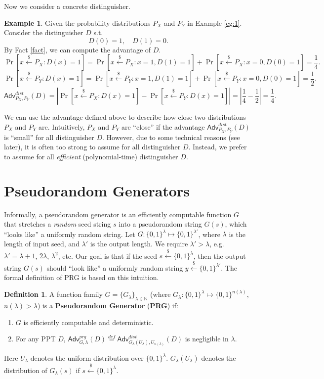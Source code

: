 \documentclass[12pt]{article}
\newcommand{\eqdef}{\stackrel{def}{=}}
\newcommand{\N}{\mathbb{N}}
\newcommand{\bits}{\{0,1\}}
\newcommand{\getsr}{\stackrel{\$}{\gets}}
\newcommand{\Adv}{\textsf{Adv}}
\theoremstyle{definition}
\newtheorem{definition}[theorem]{Definition}
\newtheorem{example}[theorem]{Example}
\begin{document}
Now we consider a concrete distinguisher.
\begin{example}
Given the probability distributions $P_X$ and $P_Y$ in Example \ref{eg:1}. Consider the distinguisher $D$ s.t.
$$D(0)=1, \quad D(1)=0.$$
By Fact \ref{fact}, we can compute the advantage of $D$.
$$\Pr[x\getsr P_X: D(x)=1] = \Pr[x\getsr P_X: x=1, D(1)=1] + \Pr[x\getsr P_X: x=0, D(0)=1] =\frac{1}{4}.$$
$$\Pr[x\getsr P_Y: D(x)=1] = \Pr[x\getsr P_Y: x=1, D(1)=1] + \Pr[x\getsr P_Y: x=0, D(0)=1] =\frac{1}{2}.$$
$$\Adv_{P_X,P_Y}^{dist}(D) = \left| \Pr[x\getsr P_X: D(x)=1] - \Pr[x\getsr P_Y: D(x)=1]\right| = \left|\frac{1}{4}-\frac{1}{2}\right| = \frac{1}{4}.$$
\end{example}

We can use the advantage defined above to describe how close two distributions $P_X$ and $P_Y$ are. Intuitively, $P_X$ and $P_Y$ are ``close'' if the advantage $\Adv_{P_X,P_Y}^{dist}(D)$ is ``small'' for all distinguisher $D$. However, due to some technical reasons (see later), it is often too strong to assume for all distinguisher $D$. Instead, we prefer to assume for all \emph{efficient} (polynomial-time) distinguisher $D$.

\section{Pseudorandom Generators}
Informally, a pseudorandom generator is an efficiently computable function $G$ that stretches a \emph{random} seed string $s$ into a pseudorandom string $G(s)$, which ``looks like'' a uniformly random string. 
Let $G: \bits^\lambda \mapsto \bits^{\lambda'}$, where $\lambda$ is the length of input seed, and $\lambda'$ is the output length. We require $\lambda' > \lambda$, e.g. $\lambda' = \lambda+1$, $2\lambda$, $\lambda^2$, etc. Our goal is that if the seed $s\getsr \bits^\lambda$, then the output string $G(s)$ should ``look like'' a uniformly random string $y\getsr\bits^{\lambda'}$. The formal definition of PRG is based on this intuition.
\begin{definition}
A function family $G = \{G_\lambda\}_{\lambda\in\N}$ (where $G_\lambda : \bits^\lambda \mapsto \bits^{n(\lambda)}$, $n(\lambda)>\lambda$) is a {\bf Pseudorandom Generator} ({\bf PRG}) if:
\begin{enumerate}
\item $G$ is efficiently computable and deterministic.
\item For any PPT $D$, $\Adv_{G,\lambda}^{prg}(D) \eqdef \Adv_{G_\lambda(U_\lambda),U_{n(\lambda)}}^{dist}(D)$ is negligible in $\lambda$.
\end{enumerate}
Here $U_\lambda$ denotes the uniform distribution over $\bits^\lambda$. $G_\lambda(U_\lambda)$ denotes the distribution of $G_\lambda(s)$ if $s\getsr\bits^\lambda$.
\end{definition}
\end{document}
